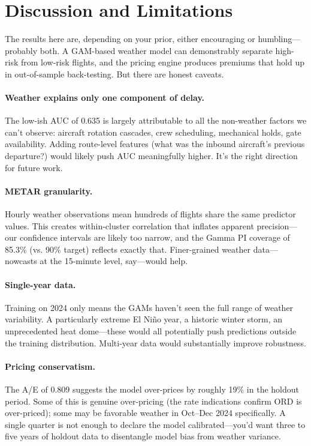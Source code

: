 \documentclass[12pt, a4paper]{article}
\begin{document}
\section{Discussion and Limitations}
\label{sec:discussion}

The results here are, depending on your prior, either encouraging or humbling---probably both. A GAM-based weather model can demonstrably separate high-risk from low-risk flights, and the pricing engine produces premiums that hold up in out-of-sample back-testing. But there are honest caveats.

\paragraph{Weather explains only one component of delay.} The low-ish AUC of 0.635 is largely attributable to all the non-weather factors we can't observe: aircraft rotation cascades, crew scheduling, mechanical holds, gate availability. Adding route-level features (what was the inbound aircraft's previous departure?) would likely push AUC meaningfully higher. It's the right direction for future work.

\paragraph{METAR granularity.} Hourly weather observations mean hundreds of flights share the same predictor values. This creates within-cluster correlation that inflates apparent precision---our confidence intervals are likely too narrow, and the Gamma PI coverage of 85.3\% (vs. 90\% target) reflects exactly that. Finer-grained weather data---nowcasts at the 15-minute level, say---would help.

\paragraph{Single-year data.} Training on 2024 only means the GAMs haven't seen the full range of weather variability. A particularly extreme El Niño year, a historic winter storm, an unprecedented heat dome---these would all potentially push predictions outside the training distribution. Multi-year data would substantially improve robustness.

\paragraph{Pricing conservatism.} The A/E of 0.809 suggests the model over-prices by roughly 19\% in the holdout period. Some of this is genuine over-pricing (the rate indications confirm ORD is over-priced); some may be favorable weather in Oct--Dec 2024 specifically. A single quarter is not enough to declare the model calibrated---you'd want three to five years of holdout data to disentangle model bias from weather variance.
\end{document}
